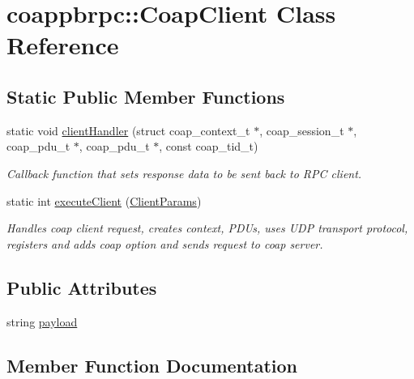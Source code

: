\hypertarget{classcoappbrpc_1_1CoapClient}{}\section{coappbrpc\+:\+:Coap\+Client Class Reference}
\label{classcoappbrpc_1_1CoapClient}
\subsection*{Static Public Member Functions}
\begin{DoxyCompactItemize}
\item 
static void \hyperlink{classcoappbrpc_1_1CoapClient_ab27b2485df1e7213425fe0f1b75110fa}{client\+Handler} (struct coap\+\_\+context\+\_\+t $\ast$, coap\+\_\+session\+\_\+t $\ast$, coap\+\_\+pdu\+\_\+t $\ast$, coap\+\_\+pdu\+\_\+t $\ast$, const coap\+\_\+tid\+\_\+t)
\begin{DoxyCompactList}\small\item\em Callback function that sets response data to be sent back to R\+PC client. \end{DoxyCompactList}\item 
static int \hyperlink{classcoappbrpc_1_1CoapClient_ac622e2dd087135defc27d8d4401a3119}{execute\+Client} (\hyperlink{structClientParams}{Client\+Params})
\begin{DoxyCompactList}\small\item\em Handles coap client request, creates context, P\+D\+Us, uses U\+DP transport protocol, registers and adds coap option and sends request to coap server. \end{DoxyCompactList}\end{DoxyCompactItemize}
\subsection*{Public Attributes}
\begin{DoxyCompactItemize}
\item 
string \hyperlink{classcoappbrpc_1_1CoapClient_ae6909f236ca1cd6b8b6343b7827ea004}{payload}
\end{DoxyCompactItemize}


\subsection{Member Function Documentation}
\mbox{\label{classcoappbrpc_1_1CoapClient_ab27b2485df1e7213425fe0f1b75110fa}} 
